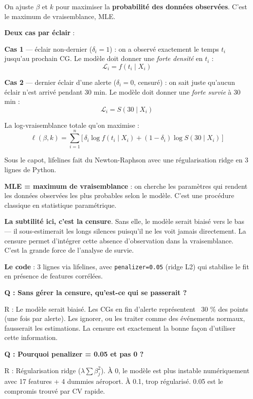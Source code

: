 \documentclass[11pt,a4paper]{article}
\begin{document}
\begin{dire}
\og On ajuste $\beta$ et $k$ pour maximiser la \textbf{probabilité des données observées}.
C'est le maximum de vraisemblance, MLE.

\textbf{Deux cas par éclair} :

\textbf{Cas 1} — éclair non-dernier ($\delta_i = 1$) : on a observé exactement le temps $t_i$
jusqu'au prochain CG. Le modèle doit donner une \emph{forte densité} en $t_i$ :
\[
\mathcal{L}_i = f(t_i \mid X_i)
\]

\textbf{Cas 2} — dernier éclair d'une alerte ($\delta_i = 0$, censuré) : on sait juste
qu'aucun éclair n'est arrivé pendant 30 min. Le modèle doit donner une \emph{forte survie}
à 30 min :
\[
\mathcal{L}_i = S(30 \mid X_i)
\]

La log-vraisemblance totale qu'on maximise :
\[
\ell(\beta, k) = \sum_{i=1}^{n} \big[\,\delta_i \log f(t_i \mid X_i) + (1-\delta_i) \log S(30 \mid X_i)\,\big]
\]

Sous le capot, lifelines fait du Newton-Raphson avec une régularisation ridge en 3 lignes
de Python. \fg{}
\end{dire}

\begin{compr}
\textbf{MLE = maximum de vraisemblance} : on cherche les paramètres qui rendent les données
observées les plus probables selon le modèle. C'est une procédure classique en statistique
paramétrique.

\textbf{La subtilité ici, c'est la censure}. Sans elle, le modèle serait biaisé vers le bas
— il sous-estimerait les longs silences puisqu'il ne les voit jamais directement. La
censure permet d'intégrer cette \og absence d'observation \fg{} dans la vraisemblance.
C'est la grande force de l'analyse de survie.

\textbf{Le code} : 3 lignes via lifelines, avec \texttt{penalizer=0.05} (ridge L2) qui
stabilise le fit en présence de features corrélées.
\end{compr}

\begin{piege}
\textbf{Q : Sans gérer la censure, qu'est-ce qui se passerait ?}

R : Le modèle serait biaisé. Les CGs en fin d'alerte représentent ~30 \% des points
(une fois par alerte). Les ignorer, ou les traiter comme des événements normaux, fausserait
les estimations. La censure est exactement la bonne façon d'utiliser cette information.

\textbf{Q : Pourquoi penalizer = 0.05 et pas 0 ?}

R : Régularisation ridge ($\lambda \sum \beta_j^2$). À 0, le modèle est plus instable
numériquement avec 17 features + 4 dummies aéroport. À 0.1, trop régularisé. 0.05 est le
compromis trouvé par CV rapide.
\end{piege}
\end{document}
